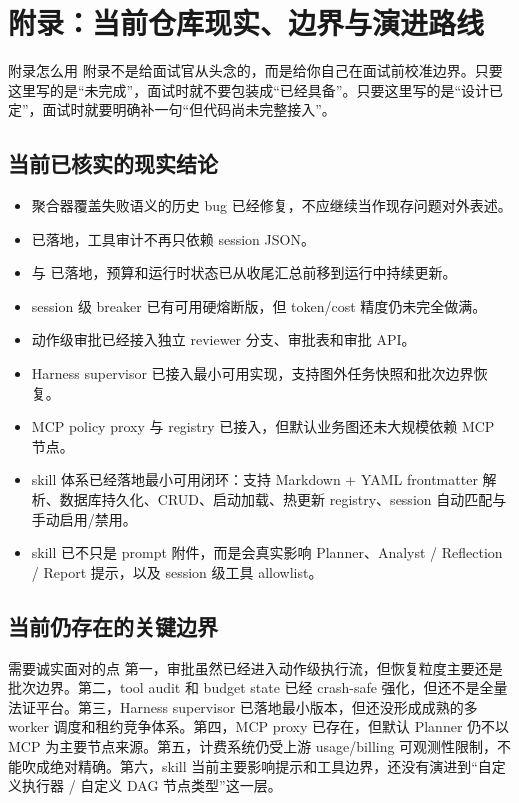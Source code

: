\documentclass[12pt]{article}
\begin{document}




\section{附录：当前仓库现实、边界与演进路线}

\begin{summaryBox}{附录怎么用}
附录不是给面试官从头念的，而是给你自己在面试前校准边界。只要这里写的是“未完成”，面试时就不要包装成“已经具备”。只要这里写的是“设计已定”，面试时就要明确补一句“但代码尚未完整接入”。
\end{summaryBox}

\subsection{当前已核实的现实结论}
\begin{itemize}[leftmargin=2em]
  \item 聚合器覆盖失败语义的历史 bug 已经修复，不应继续当作现存问题对外表述。
  \item {} 已落地，工具审计不再只依赖 session JSON。
  \item {} 与  已落地，预算和运行时状态已从收尾汇总前移到运行中持续更新。
  \item session 级 breaker 已有可用硬熔断版，但 token/cost 精度仍未完全做满。
  \item 动作级审批已经接入独立 reviewer 分支、审批表和审批 API。
  \item Harness supervisor 已接入最小可用实现，支持图外任务快照和批次边界恢复。
  \item MCP policy proxy 与 registry 已接入，但默认业务图还未大规模依赖 MCP 节点。
  \item skill 体系已经落地最小可用闭环：支持 Markdown + YAML frontmatter 解析、数据库持久化、CRUD、启动加载、热更新 registry、session 自动匹配与手动启用/禁用。
  \item skill 已不只是 prompt 附件，而是会真实影响 Planner、Analyst / Reflection / Report 提示，以及 session 级工具 allowlist。
\end{itemize}

\subsection{当前仍存在的关键边界}
\begin{riskBox}{需要诚实面对的点}
第一，审批虽然已经进入动作级执行流，但恢复粒度主要还是批次边界。第二，tool audit 和 budget state 已经 crash-safe 强化，但还不是全量法证平台。第三，Harness supervisor 已落地最小版本，但还没形成成熟的多 worker 调度和租约竞争体系。第四，MCP proxy 已存在，但默认 Planner 仍不以 MCP 为主要节点来源。第五，计费系统仍受上游 usage/billing 可观测性限制，不能吹成绝对精确。第六，skill 当前主要影响提示和工具边界，还没有演进到“自定义执行器 / 自定义 DAG 节点类型”这一层。
\end{riskBox}
\end{document}
